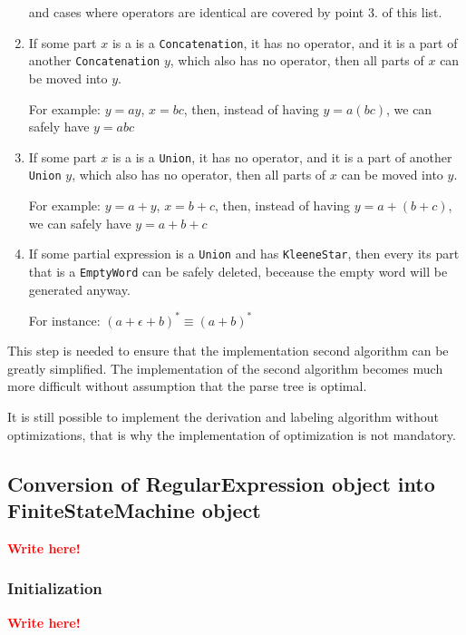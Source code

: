 \documentclass{article}
\newcommand{\writehere}{\textbf{\textcolor{red}{Write here!}}}
\begin{document}
\begin{enumerate}
  \vspace{10pt}
  and cases where operators are identical are covered by point 3. of this list.

  \item If some part $x$ is a is a \verb|Concatenation|, it has no operator, and it is a part of
  another \verb|Concatenation| $y$, which also has no operator, then all parts of $x$ can be moved
  into $y$.

  For example: $y = ay$, $x = bc$, then, instead of having $y = a(bc)$, we can safely have $y = abc$

  \item If some part $x$ is a is a \verb|Union|, it has no operator, and it is a part of another
  \verb|Union| $y$, which also has no operator, then all parts of $x$ can be moved into $y$.

  For example: $y = a+y$, $x = b+c$, then, instead of having $y = a+(b+c)$, we can safely have $y =
  a+b+c$

  \item If some partial expression is a \verb|Union| and has \verb|KleeneStar|, then every its part
  that is a \verb|EmptyWord| can be safely deleted, beceause the empty word will be generated
  anyway.

  For instance: $(a+\epsilon+b)^* \equiv (a+b)^*$

\end{enumerate}

This step is needed to ensure that the implementation second algorithm can be greatly simplified.
The implementation of the second algorithm becomes much more difficult without assumption that the
parse tree is optimal.

It is still possible to implement the derivation and labeling algorithm without optimizations, that
is why the implementation of optimization is not mandatory.

\newpage

\subsection{Conversion of RegularExpression object into FiniteStateMachine object}

\writehere

\subsubsection{Initialization}

\writehere
\end{document}
